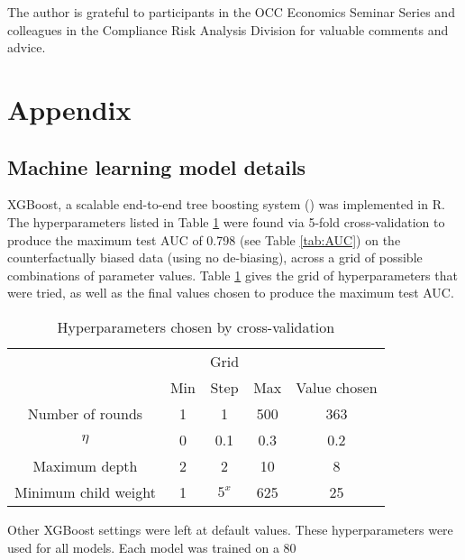 \acks The author is grateful to participants in the OCC Economics Seminar Series and colleagues in the Compliance Risk Analysis Division for valuable comments and advice.




\section{Appendix}
\subsection{Machine learning model details}\label{sec:MLmodel}
XGBoost, a scalable end-to-end tree boosting system () was implemented in R. The hyperparameters listed in Table \ref{tab:hyperparameters} were found via 5-fold cross-validation to produce the maximum test AUC of 0.798 (see Table \ref{tab:AUC}) on the counterfactually biased data (using no de-biasing), across a grid of possible combinations of parameter values. Table \ref{tab:hyperparameters} gives the grid of hyperparameters that were tried, as well as the final values chosen to produce the maximum test AUC. 
\begin{table}[H]
	\caption{Hyperparameters chosen by cross-validation\label{tab:hyperparameters}}
	\begin{onehalfspace}
				\centering{}		\begin{tabular}{c|ccc|c}
			& & Grid && \tabularnewline
			& Min & Step & Max & Value chosen \tabularnewline
			\hline
			Number of rounds & 1 & 1 & 500 & 363 \tabularnewline
			$\eta$ & 0 & 0.1 & 0.3 & 0.2 \tabularnewline
			Maximum depth & 2&2&10& 8 \tabularnewline
			Minimum child weight & 1 & $5^x$ & 625 & 25 \tabularnewline
			\hline 
		\end{tabular}
	\end{onehalfspace}
\end{table}

Other XGBoost settings were left at default values. These hyperparameters were used for all models. Each model was trained on a 80\



